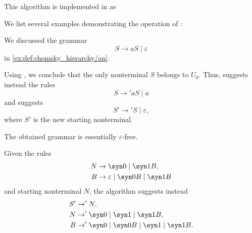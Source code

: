 \begin{comments}
  \item This algorithm is implemented in \cite{notebook:code} as
  \begin{CodeRefDisplay}
  \end{CodeRefDisplay}
\end{comments}

\begin{example}\label{ex:alg:epsilon_rule_removal}
  We list several examples demonstrating the operation of :
  \begin{thmenum}
     We discussed the grammar
    \begin{equation*}
      S \to aS \mid \varepsilon
    \end{equation*}
    in \cref{ex:def:chomsky_hierarchy/an}.

    Using , we conclude that the only nonterminal \( S \) belongs to \( U_0 \). Thus,  suggests instead the rules
    \begin{equation*}
      S \to' aS \mid a
    \end{equation*}
    and  suggests
    \begin{equation*}
      S' \to' S \mid \varepsilon,
    \end{equation*}
    where \( S' \) is the new starting nonterminal.

    The obtained grammar is essentially \( \varepsilon \)-free.

     Given the rules
    \begin{equation*}
      \begin{aligned}
        N &\to \syn0 \mid \syn1 B, \\
        B &\to \varepsilon \mid \syn0 B \mid \syn1 B
      \end{aligned}
    \end{equation*}
    and starting nonterminal \( N \), the algorithm suggests instead
    \begin{equation*}
      \begin{aligned}
        S' &\to' N, \\
        N  &\to' \syn0 \mid \syn1 \mid \syn1 B, \\
        B  &\to' \syn0 \mid \syn0 B \mid \syn1 \mid \syn1 B.
      \end{aligned}
    \end{equation*}


\end{thmenum}
\end{example}
